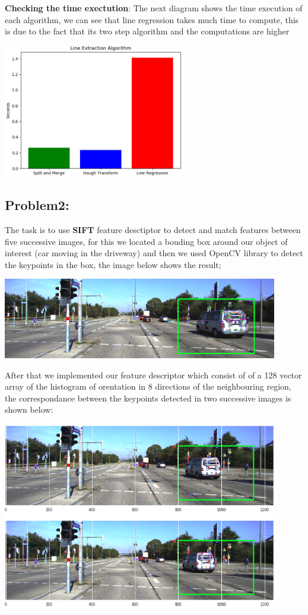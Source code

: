 \documentclass[11pt,a4paper]{report}
\begin{document}
\textbf{Checking the time exectution}:
The next diagram shows the time execution of each algorithm, we can see that line regression takes much time to compute, this is due to the fact that its  two step algorithm and the computations are higher


\begin{center}\label{fig4}
	\includegraphics[width=8cm]{Capture4.png}
\end{center}

\subsection{\textbf{Problem2:}}
The task is to use \textbf{SIFT} feature desctiptor to detect and match features between five successive images, for this we located a bouding box around our object of interest (car moving in the driveway) and then we used OpenCV library to detect the keypoints in the box, the image below shows the result;

\begin{center}\label{fig5}
	\includegraphics[width=12cm]{Capture5.png}
\end{center}

After that we implemented our feature descriptor which consist of of a 128 vector array of the histogram of orentation in 8 directions of the neighbouring region, the correspondance between the keypoints detected in two successive images is shown below:


\begin{center}\label{fig6}
	\includegraphics[width=12cm]{Capture6.png}
\end{center}
 
  
\end{document}
